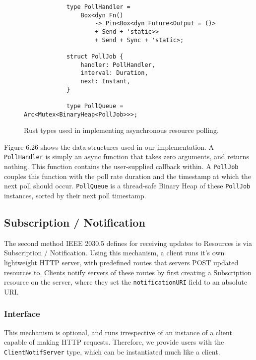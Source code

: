 \begin{figure}[h]
    \begin{center}
        \begin{lstlisting}
            type PollHandler =
                Box<dyn Fn() 
                    -> Pin<Box<dyn Future<Output = ()> 
                    + Send + 'static>> 
                    + Send + Sync + 'static>;

            struct PollJob {
                handler: PollHandler,
                interval: Duration,
                next: Instant,
            }

            type PollQueue = Arc<Mutex<BinaryHeap<PollJob>>>;

        \end{lstlisting}
        \label{fig:pollimplds}
        \vspace{-10pt}
        \caption{Rust types used in implementing asynchronous resource polling.}
    \end{center}
\end{figure}

Figure 6.26 shows the data structures used in our implementation. A \texttt{PollHandler} is simply an async function that takes zero arguments, and returns nothing. This function contains the user-supplied callback within. A \texttt{PollJob} couples this function with the poll rate duration and the timestamp at which the next poll should occur.
\texttt{PollQueue} is a thread-safe Binary Heap of these \texttt{PollJob} instances, sorted by their next poll timestamp.


\subsection{Subscription / Notification}
The second method IEEE 2030.5 defines for receiving updates to Resources is via Subscription / Notification.
Using this mechanism, a client runs it's own lightweight HTTP server, with predefined routes that servers POST updated resources to. Clients notify servers of these routes by first creating a Subscription resource on the server, where they set the \texttt{notificationURI} field to an absolute URI.

\subsubsection{Interface}
This mechanism is optional, and runs irrespective of an instance of a client capable of making HTTP requests. Therefore, we provide users with the \texttt{ClientNotifServer} type, which can be instantiated much like a client.

